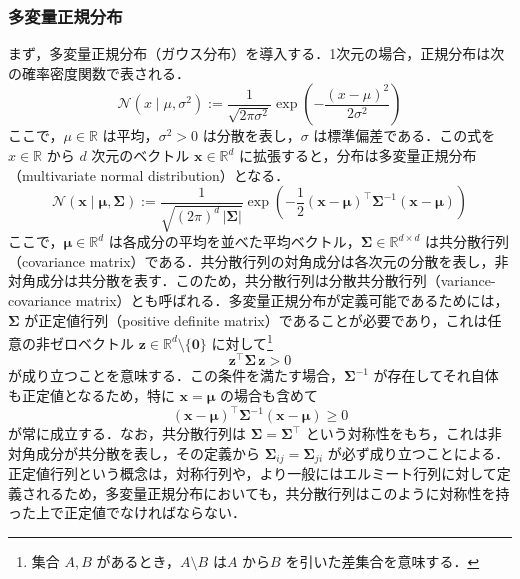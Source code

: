 \documentclass[titlepage]{ltjsbook}
\begin{document}
\subsubsection{多変量正規分布}
まず，多変量正規分布（ガウス分布）を導入する．1次元の場合，正規分布は次の確率密度関数で表される．
\begin{equation}
\mathcal{N}(x \mid \mu, \sigma^2) 
:= \frac{1}{\sqrt{2\pi \sigma^2}} \exp\left( -\frac{(x-\mu)^2}{2\sigma^2} \right)
\end{equation}
ここで，$\mu \in \mathbb{R}$ は平均，$\sigma^2 > 0$ は分散を表し，$\sigma$ は標準偏差である．この式を $x \in \mathbb{R}$ から $d$ 次元のベクトル $\mathbf{x} \in \mathbb{R}^d$ に拡張すると，分布は多変量正規分布（multivariate normal distribution）となる．
\begin{equation}
\mathcal{N}(\mathbf{x} \mid \boldsymbol{\mu}, \boldsymbol{\Sigma}) 
:= \frac{1}{\sqrt{(2\pi)^d \, |\boldsymbol{\Sigma}|}}
\exp\left( -\frac{1}{2} (\mathbf{x} - \boldsymbol{\mu})^\top \boldsymbol{\Sigma}^{-1} (\mathbf{x} - \boldsymbol{\mu}) \right)
\end{equation}
ここで，$\boldsymbol{\mu} \in \mathbb{R}^d$ は各成分の平均を並べた平均ベクトル，$\boldsymbol{\Sigma} \in \mathbb{R}^{d \times d}$ は共分散行列（covariance matrix）である．共分散行列の対角成分は各次元の分散を表し，非対角成分は共分散を表す．このため，共分散行列は分散共分散行列（variance-covariance matrix）とも呼ばれる．多変量正規分布が定義可能であるためには，$\boldsymbol{\Sigma}$ が正定値行列（positive definite matrix）であることが必要であり，これは任意の非ゼロベクトル $\mathbf{z} \in \mathbb{R}^d \setminus \{\mathbf{0}\}$ に対して\footnote{集合 $A, B$ があるとき，$A \setminus B$ は$A$ から$B$ を引いた差集合を意味する．}
\begin{equation}
\mathbf{z}^\top \boldsymbol{\Sigma} \, \mathbf{z} > 0
\end{equation}
が成り立つことを意味する．この条件を満たす場合，$\boldsymbol{\Sigma}^{-1}$ が存在してそれ自体も正定値となるため，特に $\mathbf{x} = \boldsymbol{\mu}$ の場合も含めて
\begin{equation}
(\mathbf{x} - \boldsymbol{\mu})^\top \boldsymbol{\Sigma}^{-1} (\mathbf{x} - \boldsymbol{\mu}) \geq 0
\end{equation}
が常に成立する．なお，共分散行列は $\boldsymbol{\Sigma} = \boldsymbol{\Sigma}^\top$ という対称性をもち，これは非対角成分が共分散を表し，その定義から $\boldsymbol{\Sigma}_{ij} = \boldsymbol{\Sigma}_{ji}$ が必ず成り立つことによる．正定値行列という概念は，対称行列や，より一般にはエルミート行列に対して定義されるため，多変量正規分布においても，共分散行列はこのように対称性を持った上で正定値でなければならない．
\end{document}
